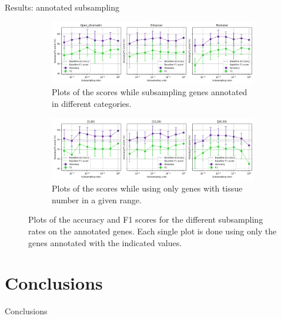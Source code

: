 \documentclass[aspectratio=169]{beamer}
\begin{document}
\begin{frame}{Results: annotated subsampling}
\begin{figure}[ht!]
\centering
\begin{subfigure}[ht]{\textwidth}
    \centering
    \includegraphics[width=\textwidth]{../figures/subsample_annotated.png}
\caption{Plots of the scores while subsampling genes annotated in different categories.}
\label{fig:res2a}
\end{subfigure}

\begin{subfigure}[ht]{\textwidth}
\centering
\includegraphics[width=\textwidth]{../figures/subsample_ntissue.png}
\caption{Plots of the scores while using only genes with tissue number in a given range.}
\label{fig:res2b}
\end{subfigure}
\caption{Plots of the accuracy and F1 scores for the different subsampling rates on the annotated genes. Each single plot is done using only the genes annotated with the indicated values.}
\label{fig:res2}
\end{figure}
\end{frame}

\section{Conclusions}
\begin{frame}{Conclusions}
\end{frame}
\end{document}

